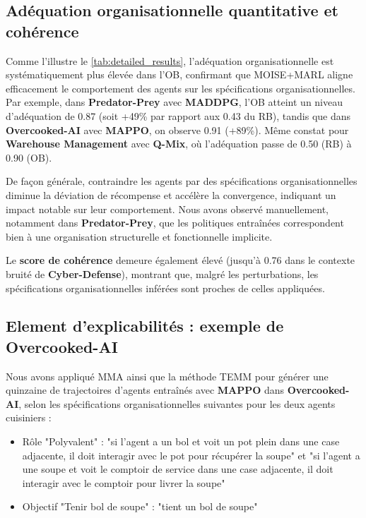 \documentclass[francais,ROIA,Unicode,manuscript]{cedram}
\begin{document}
\subsection{Adéquation organisationnelle quantitative et cohérence}

\noindent
Comme l'illustre le \autoref{tab:detailed_results}, l'adéquation organisationnelle est systématiquement plus élevée dans l'OB, confirmant que MOISE+MARL aligne efficacement le comportement des agents sur les spécifications organisationnelles.
Par exemple, dans \textbf{Predator-Prey} avec \textbf{MADDPG}, l'OB atteint un niveau d'adéquation de 0.87 (soit +49\% par rapport aux 0.43 du RB), tandis que dans \textbf{Overcooked-AI} avec \textbf{MAPPO}, on observe 0.91 (+89\%). Même constat pour \textbf{Warehouse Management} avec \textbf{Q-Mix}, où l'adéquation passe de 0.50 (RB) à 0.90 (OB).

\medskip
\noindent
De façon générale, contraindre les agents par des spécifications organisationnelles diminue la déviation de récompense et accélère la convergence, indiquant un impact notable sur leur comportement. Nous avons observé manuellement, notamment dans \textbf{Predator-Prey}, que les politiques entraînées correspondent bien à une organisation structurelle et fonctionnelle implicite.

\medskip
\noindent
Le \textbf{score de cohérence} demeure également élevé (jusqu’à 0.76 dans le contexte bruité de \textbf{Cyber-Defense}), montrant que, malgré les perturbations, les spécifications organisationnelles inférées sont proches de celles appliquées.

\subsection{Element d'explicabilités : exemple de Overcooked-AI}

Nous avons appliqué MMA ainsi que la méthode TEMM pour générer une quinzaine de trajectoires d'agents entraînés avec \textbf{MAPPO} dans \textbf{Overcooked-AI}, selon les spécifications organisationnelles suivantes pour les deux agents cuisiniers :
%
\begin{itemize}
    \item Rôle "Polyvalent" : "si l'agent a un bol et voit un pot plein dans une case adjacente, il doit interagir avec le pot pour récupérer la soupe" et "si l'agent a une soupe et voit le comptoir de service dans une case adjacente, il doit interagir avec le comptoir pour livrer la soupe"
    \item Objectif "Tenir bol de soupe" : "tient un bol de soupe"
\end{itemize}
\end{document}
